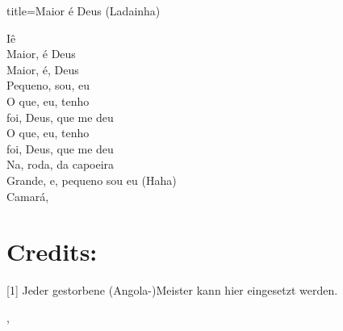 \documentclass[fontsize=14pt, paper=a4, twoside, DIV=20]{scrreprt} %
\begin{document}
\begin{multicols*}{2}
\begin{song}{title={Maior é Deus (Ladainha)}}
    \begin{verse*}
Iê\,\\
Maior, é Deus\\
Maior, é, Deus\\
Pequeno, sou, eu\\
O que, eu, tenho\\
foi, Deus, que me deu\\
O que, eu, tenho\\
foi, Deus, que me deu\\
Na, roda, da capoeira\\
Grande, e, pequeno sou eu (Haha)\\
Camará,\\
    \end{verse*}
\end{song}

\chapter*{Credits:}
[1] Jeder  gestorbene (Angola-)Meister kann hier eingesetzt werden.

\end{multicols*},
\end{document}
